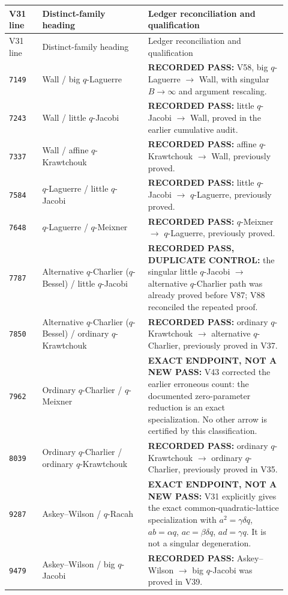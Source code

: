 \documentclass[11pt]{article}
\begin{document}
\begin{longtable}{@{}p{0.11\linewidth}p{0.35\linewidth}p{0.46\linewidth}@{}}
\toprule V31 line & Distinct-family heading & Ledger reconciliation and qualification \\
\midrule\endfirsthead
\toprule V31 line & Distinct-family heading & Ledger reconciliation and qualification \\
\midrule\endhead
\bottomrule\endfoot
\texttt{7149} & Wall / big $q$-Laguerre & \textbf{RECORDED PASS:} V58, big $q$-Laguerre $\to$ Wall, with singular $B\to\infty$ and argument rescaling. \\
\texttt{7243} & Wall / little $q$-Jacobi & \textbf{RECORDED PASS:} little $q$-Jacobi $\to$ Wall, proved in the earlier cumulative audit. \\
\texttt{7337} & Wall / affine $q$-Krawtchouk & \textbf{RECORDED PASS:} affine $q$-Krawtchouk $\to$ Wall, previously proved. \\
\texttt{7584} & $q$-Laguerre / little $q$-Jacobi & \textbf{RECORDED PASS:} little $q$-Jacobi $\to$ $q$-Laguerre, previously proved. \\
\texttt{7648} & $q$-Laguerre / $q$-Meixner & \textbf{RECORDED PASS:} $q$-Meixner $\to$ $q$-Laguerre, previously proved. \\
\texttt{7787} & Alternative $q$-Charlier ($q$-Bessel) / little $q$-Jacobi & \textbf{RECORDED PASS, DUPLICATE CONTROL:} the singular little $q$-Jacobi $\to$ alternative $q$-Charlier path was already proved before V87; V88 reconciled the repeated proof. \\
\texttt{7850} & Alternative $q$-Charlier ($q$-Bessel) / ordinary $q$-Krawtchouk & \textbf{RECORDED PASS:} ordinary $q$-Krawtchouk $\to$ alternative $q$-Charlier, previously proved in V37. \\
\texttt{7962} & Ordinary $q$-Charlier / $q$-Meixner & \textbf{EXACT ENDPOINT, NOT A NEW PASS:} V43 corrected the earlier erroneous count: the documented zero-parameter reduction is an exact specialization. No other arrow is certified by this classification. \\
\texttt{8039} & Ordinary $q$-Charlier / ordinary $q$-Krawtchouk & \textbf{RECORDED PASS:} ordinary $q$-Krawtchouk $\to$ ordinary $q$-Charlier, previously proved in V35. \\
\texttt{9287} & Askey--Wilson / $q$-Racah & \textbf{EXACT ENDPOINT, NOT A NEW PASS:} V31 explicitly gives the exact common-quadratic-lattice specialization with $a^2=\gamma\delta q$, $ab=\alpha q$, $ac=\beta\delta q$, $ad=\gamma q$. It is not a singular degeneration. \\
\texttt{9479} & Askey--Wilson / big $q$-Jacobi & \textbf{RECORDED PASS:} Askey--Wilson $\to$ big $q$-Jacobi was proved in V39. \\
\end{longtable}
\end{document}

